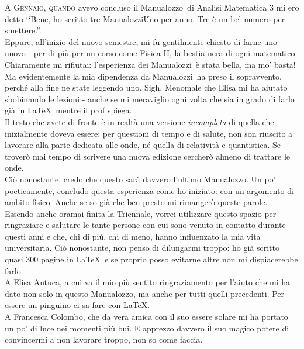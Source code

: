 \lettrine[findent=1pt, nindent=0pt]{A}{ Gennaio, quando} avevo concluso il Manualozzo\texttrademark\ di Analisi Matematica 3 mi ero detto ‘‘Bene, ho scritto tre Manualozzi\texttrademark\. Uno per anno. Tre è un bel numero per smettere.''.\\
Eppure, all'inizio del nuovo semestre, mi fu gentilmente chiesto di farne uno nuovo - per di più per un corso come Fisica II, la bestia nera di ogni matematico. Chiaramente mi rifiutai: l'esperienza dei Manualozzi\texttrademark\ è stata bella, ma mo' basta! Ma evidentemente la mia dipendenza da Manualozzi\texttrademark\ ha preso il sopravvento, perché alla fine ne state leggendo uno. Sigh. Menomale che Elisa mi ha aiutato sbobinando le lezioni - anche se mi meraviglio ogni volta che sia in grado di farlo già in \LaTeX\ mentre il prof spiega.\\
\newline
\noindent Il testo che avete di fronte è in realtà una versione \textit{incompleta} di quella che inizialmente doveva essere: per questioni di tempo e di salute, non son riuscito a lavorare alla parte dedicata alle onde, né quella di relatività e quantistica. Se troverò mai tempo di scrivere una nuova edizione cercherò almeno di trattare le onde.\\
Ciò nonostante, credo che questo sarà davvero l'ultimo Manualozzo\texttrademark. Un po' poeticamente, concludo questa esperienza come ho iniziato: con un argomento di ambito fisico. Anche se so già che ben presto mi rimangerò queste parole.\\
\newline
\noindent Essendo anche oramai finita la Triennale, vorrei utilizzare questo spazio per ringraziare e salutare le tante persone con cui sono venuto in contatto durante questi anni e che, chi di più, chi di meno, hanno influenzato la mia vita universitaria. Ciò nonostante, non penso di dilungarmi troppo: ho già scritto quasi 300 pagine in \LaTeX\ e se proprio posso evitarne altre non mi dispiacerebbe farlo.\\
\newline
A Elisa Antuca, a cui va il mio più sentito ringraziamento per l'aiuto che mi ha dato non solo in questo Manualozzo\texttrademark, ma anche per tutti quelli precedenti. Per essere un pinguino ci sa fare con \LaTeX.\\
A Francesca Colombo, che da vera amica con il suo essere solare mi ha portato un po' di luce nei momenti più bui. E apprezzo davvero il suo magico potere di convincermi a non lavorare troppo, non so come faccia.\\
